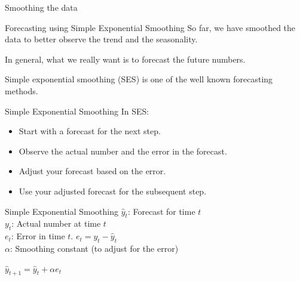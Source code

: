 \documentclass{beamer}\usepackage[]{graphicx}\usepackage[]{color}
\newenvironment{knitrout}{}{} %
\begin{document}
\begin{darkframes}
\begin{frame}[fragile]{Smoothing the data}
\begin{knitrout}
\end{knitrout}
    \lc
    \end{frame}
    
    
    \begin{frame}[fragile]{Forecasting using Simple Exponential Smoothing}
      \fontsize{9}{9}\selectfont
        So far, we have smoothed the data to better observe the trend and the seasonality.
        \bigskip
        
        In general, what we really want is to forecast the future numbers.
        \bigskip
        
        Simple exponential smoothing (SES) is one of the well known forecasting methods.
  
    \end{frame}
    
    
    
    \begin{frame}[fragile]{Simple Exponential Smoothing}
     \fontsize{9}{9}\selectfont
      In SES:
      
      \begin{itemize}[<+->]
        \item Start with a forecast for the next step.
        \item Observe the actual number and the error in the forecast.
        \item Adjust your forecast based on the error.
        \item Use your adjusted forecast for the subsequent step.
     \end{itemize}

    \end{frame}
    
    
    
    \begin{frame}[fragile]{Simple Exponential Smoothing}
     \fontsize{9}{9}\selectfont
      $\hat{y}_t$: Forecast for time $t$ \\
      $y_t$: Actual number at time $t$ \\ 
      $e_t$: Error in time $t$. $e_t = y_t - \hat{y}_t$ \\
      $\alpha$: Smoothing constant (to adjust for the error)
      \bigskip
      
      \begin{center}
          $ \hat{y}_{t+1} = \hat{y}_t + \alpha e_t $ \\ \bigskip
          

\end{center}
\end{frame}
\end{darkframes}
\end{document}
